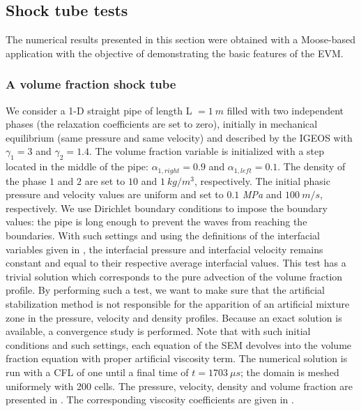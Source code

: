 \documentclass[preprint,10pt]{elsarticle}
\begin{document}
\subsection{Shock tube tests}\label{sec:1d-results-sba}
%
The numerical results presented in this section were obtained with a Moose-based application with the objective of demonstrating the basic features of the EVM.
%
\subsubsection{A volume fraction shock tube}\label{sec:vf-advection-test}
%
We consider a 1-D straight pipe of length L $=1 \ m$ filled with two independent phases (the relaxation coefficients are set to zero), initially in mechanical 
equilibrium (same pressure and same velocity) and described by the IGEOS with $\gamma_1 = 3$ and $\gamma_2 = 1.4$. The volume 
fraction variable is initialized with a step located in the middle of the pipe: $\alpha_{1,right}=0.9$ and $\alpha_{1,left}=0.1$. The density of the phase $1$ and $2$ are set to $10$ and $1 \ kg/
m^3$, respectively.  
The initial phasic pressure and velocity values are uniform and set to $0.1$ {\it MPa} and $100 \ m/s$, respectively. We use Dirichlet boundary 
conditions to impose the boundary values: the pipe is long enough to prevent the waves from reaching the boundaries. With such settings and using the definitions of 
the interfacial variables given in , the interfacial pressure and 
interfacial velocity remains constant and equal to their respective average interfacial values. This test has a trivial solution which corresponds to 
the pure advection of the volume fraction 
profile. By performing such a test, we want to make sure that the artificial stabilization method is not responsible for the apparition of an artificial 
mixture zone in the pressure, velocity and density profiles. Because an exact solution is available, a convergence study is performed. 
Note that with such initial conditions and such settings, each equation of the SEM devolves into the volume fraction equation with proper artificial viscosity term. The 
numerical solution is run with a CFL of one until a final time of $t=1703 \ \mu s$; the domain is meshed uniformely with 200 cells. The pressure, velocity, density and volume 
fraction are presented in . The corresponding viscosity coefficients are given in .
\end{document}
